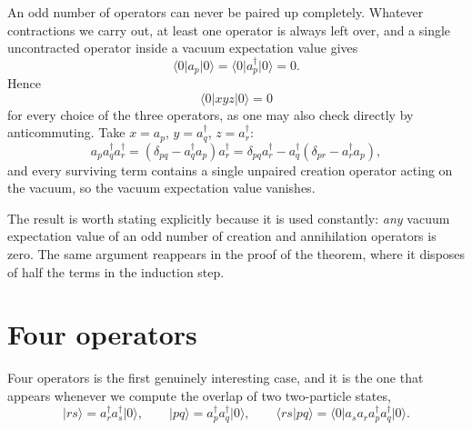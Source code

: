 An odd number of operators can never be paired up completely.  Whatever
contractions we carry out, at least one operator is always left over, and a
single uncontracted operator inside a vacuum expectation value gives
\begin{equation}
  \langle 0\vert a_p\vert 0\rangle
   = \langle 0\vert a_p^{\dagger}\vert 0\rangle = 0 .
  \label{eq:3-oddvanishes}
\end{equation}
Hence
\begin{equation}
  \langle 0\vert xyz\vert 0\rangle = 0
  \label{eq:3-wick3}
\end{equation}
for every choice of the three operators, as one may also check directly by
anticommuting.  Take $x=a_p$, $y=a_q^{\dagger}$, $z=a_r^{\dagger}$:
\begin{equation}
  a_p a_q^{\dagger}a_r^{\dagger}
   = \left(\delta_{pq}-a_q^{\dagger}a_p\right)a_r^{\dagger}
   = \delta_{pq}a_r^{\dagger}
   - a_q^{\dagger}\left(\delta_{pr}-a_r^{\dagger}a_p\right),
  \label{eq:3-three1}
\end{equation}
and every surviving term contains a single unpaired creation operator acting
on the vacuum, so the vacuum expectation value vanishes.

The result is worth stating explicitly because it is used constantly:
\emph{any} vacuum expectation value of an odd number of creation and
annihilation operators is zero.  The same argument reappears in the proof of
the theorem, where it disposes of half the terms in the induction step.

\section{Four operators}
\label{sec:wickfour}

Four operators is the first genuinely interesting case, and it is the one that
appears whenever we compute the overlap of two two-particle states,
\begin{equation}
  \vert rs\rangle = a_r^{\dagger}a_s^{\dagger}\vert 0\rangle,
  \qquad
  \vert pq\rangle = a_p^{\dagger}a_q^{\dagger}\vert 0\rangle,
  \qquad
  \langle rs\vert pq\rangle
   = \langle 0\vert a_s a_r a_p^{\dagger}a_q^{\dagger}\vert 0\rangle .
  \label{eq:3-fouroverlap}
\end{equation}

